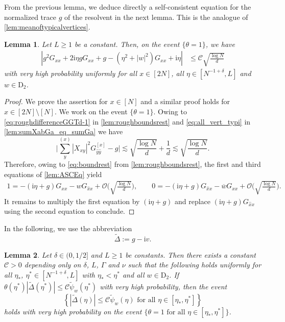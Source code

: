 \documentclass[11pt]{article}
\newcommand{\ii}{\mathrm{i}}
\newcommand{\abs}[1]{\left| #1 \right|}
\theoremstyle{plain}
\newtheorem{lemma}{Lemma}[section]
\theoremstyle{remark}
\numberwithin{equation}{section}
\newcommand*\barr[1]{\overline{#1}}
\newcommand*\bset[1]{[#1]}
\newcommand*\ubarr[1]{{\widehat{#1}}}
\begin{document}
	From the previous lemma, we deduce directly a self-consistent equation for the normalized trace $g$ of the resolvent in the next lemma. This is the analogue of \cref{lem:meanoftypicalvertices}.  
	\begin{lemma}\label{lem:stielt_first_mean}
		Let $L \geq 1$ be a constant. Then, on the event $\{\theta =1\}$, we have  
		\begin{align*}
			|g^2 G_{xx} + 2\ii \eta g G_{xx} + g -(\eta^2 + \abs{w}^2) G_{xx} + \ii \eta| &\le  \mathcal{C} \sqrt{\frac{\log N}{d}}
		\end{align*}
		with very high probability
		uniformly for all $x\in [2N]$, all $\eta \in [N^{-1+ \delta},L]$ and $w \in \mathrm{D}_2$. 
	\end{lemma}
	\begin{proof}
		We prove the assertion for $x \in [N]$ and a similar proof holds for $x \in [2N]\setminus [N]$. We work on the event $\{\theta =1\}$. Owing to \eqref{eq:roughdifferenceGGTd-1} in \cref{lem:roughboundsrest} and \eqref{eq:all_vert_typi} in \cref{lem:sumXabGa_eq_sumGa} we have 
		\begin{equation}\label{eq:concentrate_around_Stielt}
			\biggl|\sum_{y}^{(x)} |X_{xy}|^2 G_{\ubarr{y} \ubarr{y}}^{\bset{x}} - g\biggr|\lesssim \sqrt{\frac{\log N}{d}} + \frac{1}{d} \lesssim \sqrt{\frac{\log N}{d}}. 
		\end{equation}
		Therefore, owing to \eqref{eq:boundrest} from \cref{lem:roughboundsrest},  the first and third equations of \cref{lem:ASCEq} yield 
		\begin{align*}
			1 = -(\ii \eta + g ) G_{xx} - w G_{\ubarr{x}x} + \mathcal O \bigg(\sqrt{\frac{\log N}{d}}\bigg), \qquad 
			0 = -(\ii \eta + g) G_{\ubarr{x}x} - \barr{w} G_{xx} + \mathcal O \bigg(\sqrt{\frac{\log N}{d}}\bigg).
		\end{align*}
		It remains to multiply the first equation by $(\ii \eta + g)$ and replace $(\ii \eta + g)G_{\ubarr{x}x}$ using the second equation to conclude.
	\end{proof}
	In the following, we use the abbreviation 
	\begin{equation*}
		\widetilde{\Delta}:= g - \ii v.
	\end{equation*}
	\begin{lemma}\label{lem:3rddegeqonDelta2}
		Let $\delta \in (0,1/2]$ and $L \geq 1$ be constants. Then there exists a constant $\mathcal C >0$ depending only on $\delta$, $L$, $\Gamma$ and $\nu$ such that the following holds uniformly for all $\eta_*$, $\eta^* \in [N^{-1+\delta},L]$ with $\eta_* < \eta^*$ and all $w \in \mathrm{D}_2$. If 
		$\theta (\eta^\ast) |\widetilde{\Delta}(\eta^{\ast})| \leq \mathcal C \widetilde{\psi}_w(\eta^\ast)  $ 
		with very high probability, then the event
		\[ 
		\left\{ |\widetilde{\Delta}(\eta)| \leq \mathcal C \widetilde{\psi}_w(\eta)  \text{ for all } \eta \in [\eta_*,\eta^*] 
		\right\}
		\] 
		holds with very high probability on the event $\{ \theta = 1 \text{ for all } \eta \in [\eta_*, \eta^*]\}$. 
	\end{lemma}
	
\end{document}
